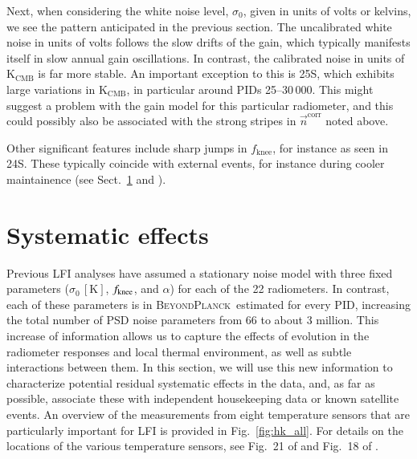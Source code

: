 \documentclass[twocolumn]{aa}
\newcommand{\n}[0]{\vec{n}}
\newcommand{\BP}{\textsc{BeyondPlanck}}
\begin{document}
Next, when considering the white noise level, $\sigma_0$, given in
units of volts or kelvins, we see the pattern anticipated
in the previous section. The uncalibrated white noise in units of volts
follows the slow drifts of the gain, which typically manifests itself
in slow annual gain oscillations. In contrast, the calibrated noise in
units of $\mathrm{K}_{\mathrm{CMB}}$ is far more stable. An important
exception to this is 25S, which exhibits large variations in
$\mathrm{K}_{\mathrm{CMB}}$, in particular around PIDs
25--30\,000. This might suggest a problem with the gain model for this
particular radiometer, and this could possibly also be associated with
the strong stripes in $\n^{\mathrm{corr}}$ noted above.

Other significant features include sharp jumps in $f_{\mathrm{knee}}$,
for instance as seen in 24S. These typically coincide with external
events, for instance during cooler maintainence (see
Sect.~\ref{sec:systematics} and \citealp{bp09}).


\section{Systematic effects}
\label{sec:systematics}
Previous LFI analyses have assumed a stationary noise model with three
fixed parameters ($\sigma_0 \,\mathrm{[K]}$, $f_{\rm knee}$, and
$\alpha$) for each of the 22 radiometers. In contrast, each of these
parameters is in \BP\ estimated for every PID, increasing the total
number of PSD noise parameters from 66 to about 3 million. This
increase of information allows us to capture the effects of evolution
in the radiometer responses and local thermal environment, as well as
subtle interactions between them. In this section, we will use this
new information to characterize potential residual systematic effects
in the data, and, as far as possible, associate these with independent
housekeeping data or known satellite events. An overview of the
measurements from eight temperature sensors that are particularly
important for LFI is provided in Fig.~\ref{fig:hk_all}. For details on
the locations of the various temperature sensors, see Fig.~21 of
\citet{bersanelli2010} and Fig.~18 of \citet{lamarre2010}. 
\end{document}
